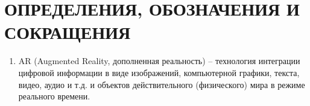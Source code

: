 \chapter*{ОПРЕДЕЛЕНИЯ, ОБОЗНАЧЕНИЯ И СОКРАЩЕНИЯ}

\begin{enumerate}
	\item AR (Augmented Reality, дополненная реальность) -- технология интеграции цифровой информации в виде изображений, компьютерной графики, текста, видео, аудио и т.д. и объектов действительного (физического) мира в режиме реального времени.
\end{enumerate}